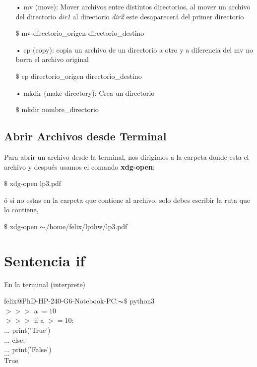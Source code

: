 \documentclass[12pt,openany]{scrbook}
\begin{document}
\begin{itemize}
\item[•] mv (move): Mover archivos entre distintos directorios, al mover un archivo del directorio \textit{dir1} al directorio \textit{dir2} este desaparecer\'a del primer directorio

\hspace{1cm}	$\$$ mv directorio\_origen directorio\_destino

\item[•] cp (copy): copia un archivo de un directorio a otro y a diferencia del mv no borra el
archivo original

\hspace{1cm} $\$$ cp directorio\_origen directorio\_destino 

\item[•] mkdir (make directory): Crea un directorio

\hspace{1cm} $\$$ mkdir nombre\_directorio


\end{itemize}	


\subsection{Abrir Archivos desde Terminal}
Para abrir un archivo desde la terminal, nos
dirigimos a la carpeta donde esta el archivo y despu\'es
usamos el comando \textbf{xdg-open}:

\hspace{1cm} $\$$ xdg-open lp3.pdf

\'o si no estas en la carpeta que contiene al archivo, 
solo debes escribir la ruta que lo contiene, 

\hspace{1cm} $\$$ xdg-open $\thicksim$/home/felix/lpthw/lp3.pdf







\section{Sentencia if}

En la terminal (interprete)

felix@PhD-HP-240-G6-Notebook-PC:$\thicksim$\vspace{0cm}$\$$   python3 \\
$>>>$ a $= 10$ \\
$>>>$ if a $>= 10$: \\
$...$ \qquad \quad print('True') \\
$...$ else: \\
$...$  \qquad \quad print('False') \\
$...$ \\
True
\end{document}
